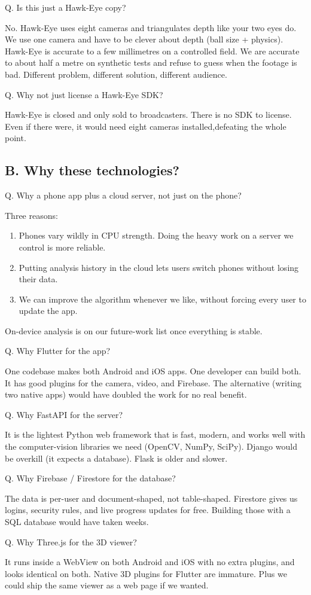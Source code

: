 \documentclass[11pt,a4paper]{article}
\newcommand{\qa}[2]{%
  \par\vspace{8pt}%
  \noindent
  \colorbox{NavyTint}{%
    \begin{minipage}{\dimexpr\textwidth-2\fboxsep\relax}%
      \color{white}\bfseries\strut Q. #1%
    \end{minipage}%
  }\par\nobreak
  \noindent
  \colorbox{MutedBg}{%
    \begin{minipage}{\dimexpr\textwidth-2\fboxsep\relax}%
      \color{black}\setlength{\parskip}{4pt}\strut #2\strut%
    \end{minipage}%
  }%
  \par\vspace{6pt}%
}
\begin{document}
\qa{Is this just a Hawk-Eye copy?}{%
No. Hawk-Eye uses eight cameras and triangulates depth like your two eyes do. We use one camera and have to be clever about depth (ball size + physics). Hawk-Eye is accurate to a few millimetres on a controlled field. We are accurate to about half a metre on synthetic tests and refuse to guess when the footage is bad. Different problem, different solution, different audience.}

\qa{Why not just license a Hawk-Eye SDK?}{%
Hawk-Eye is closed and only sold to broadcasters. There is no SDK to license. Even if there were, it would need eight cameras installed,defeating the whole point.}

\subsection{B. Why these technologies?}

\qa{Why a phone app plus a cloud server, not just on the phone?}{%
Three reasons:
\begin{enumerate}
    \item Phones vary wildly in CPU strength. Doing the heavy work on a server we control is more reliable.
    \item Putting analysis history in the cloud lets users switch phones without losing their data.
    \item We can improve the algorithm whenever we like, without forcing every user to update the app.
\end{enumerate}
On-device analysis is on our future-work list once everything is stable.}

\qa{Why Flutter for the app?}{%
One codebase makes both Android and iOS apps. One developer can build both. It has good plugins for the camera, video, and Firebase. The alternative (writing two native apps) would have doubled the work for no real benefit.}

\qa{Why FastAPI for the server?}{%
It is the lightest Python web framework that is fast, modern, and works well with the computer-vision libraries we need (OpenCV, NumPy, SciPy). Django would be overkill (it expects a database). Flask is older and slower.}

\qa{Why Firebase / Firestore for the database?}{%
The data is per-user and document-shaped, not table-shaped. Firestore gives us logins, security rules, and live progress updates for free. Building those with a SQL database would have taken weeks.}

\qa{Why Three.js for the 3D viewer?}{%
It runs inside a WebView on both Android and iOS with no extra plugins, and looks identical on both. Native 3D plugins for Flutter are immature. Plus we could ship the same viewer as a web page if we wanted.}
\end{document}
